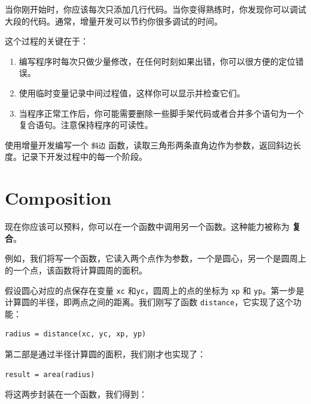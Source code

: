 
当你刚开始时，你应该每次只添加几行代码。当你变得熟练时，你发现你可以调试大段的代码。通常，增量开发可以节约你很多调试的时间。

这个过程的关键在于：

\begin{enumerate}

\item 编写程序时每次只做少量修改，在任何时刻如果出错，你可以很方便的定位错误。

\item 使用临时变量记录中间过程值，这样你可以显示并检查它们。

\item 当程序正常工作后，你可能需要删除一些脚手架代码或者合并多个语句为一个复合语句。注意保持程序的可读性。

\end{enumerate}

\begin{ex}


使用增量开发编写一个 {\tt 斜边} 函数，读取三角形两条直角边作为参数，返回斜边长度。记录下开发过程中的每一个阶段。
\end{ex}

\section{Composition}


现在你应该可以预料，你可以在一个函数中调用另一个函数。这种能力被称为 {\bf 复合}。

例如，我们将写一个函数，它读入两个点作为参数，一个是圆心，另一个是圆周上的一个点，该函数将计算圆周的面积。

假设圆心对应的点保存在变量 {\tt xc} 和{\tt yc}，圆周上的点的坐标为 {\tt xp} 和 {\tt yp}。第一步是计算圆的半径，即两点之间的距离。我们刚写了函数 {\tt distance}，它实现了这个功能：

\beforeverb
\begin{verbatim}
radius = distance(xc, yc, xp, yp)
\end{verbatim}
\afterverb
%
第二部是通过半径计算圆的面积，我们刚才也实现了：

\beforeverb
\begin{verbatim}
result = area(radius)
\end{verbatim}
\afterverb
%
将这两步封装在一个函数，我们得到：

